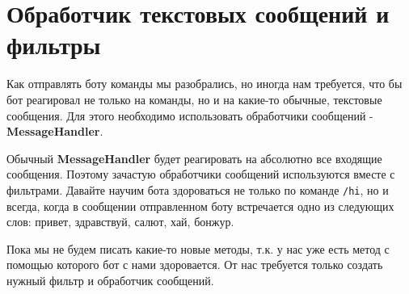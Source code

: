 \documentclass[
]{book}
\begin{document}
\hypertarget{ux43eux431ux440ux430ux431ux43eux442ux447ux438ux43a-ux442ux435ux43aux441ux442ux43eux432ux44bux445-ux441ux43eux43eux431ux449ux435ux43dux438ux439-ux438-ux444ux438ux43bux44cux442ux440ux44b}{%
\section{Обработчик текстовых сообщений и фильтры}\label{ux43eux431ux440ux430ux431ux43eux442ux447ux438ux43a-ux442ux435ux43aux441ux442ux43eux432ux44bux445-ux441ux43eux43eux431ux449ux435ux43dux438ux439-ux438-ux444ux438ux43bux44cux442ux440ux44b}}

Как отправлять боту команды мы разобрались, но иногда нам требуется, что бы бот реагировал не только на команды, но и на какие-то обычные, текстовые сообщения. Для этого необходимо использовать обработчики сообщений - \textbf{MessageHandler}.

Обычный \textbf{MessageHandler} будет реагировать на абсолютно все входящие сообщения. Поэтому зачастую обработчики сообщений используются вместе с фильтрами. Давайте научим бота здороваться не только по команде \texttt{/hi}, но и всегда, когда в сообщении отправленном боту встречается одно из следующих слов: привет, здравствуй, салют, хай, бонжур.

Пока мы не будем писать какие-то новые методы, т.к. у нас уже есть метод с помощью которого бот с нами здоровается. От нас требуется только создать нужный фильтр и обработчик сообщений.
\end{document}
